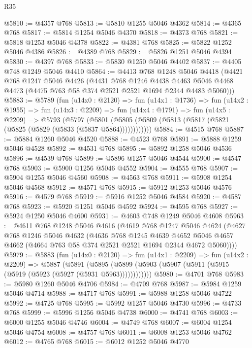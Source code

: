 \begin{lexlean}{R35}
\begin{coremodule}
@5810 := @4357 @768
@5813 := @5810 @1255 @5046 @4362
@5814 := @4365 @768
@5817 := @5814 @1254 @5046 @4370
@5818 := @4373 @768
@5821 := @5818 @1253 @5046 @4378
@5822 := @4381 @768
@5825 := @5822 @1252 @5046 @4386
@5826 := @4389 @768
@5829 := @5826 @1251 @5046 @4394
@5830 := @4397 @768
@5833 := @5830 @1250 @5046 @4402
@5837 := @4405 @748 @1249 @5046 @4410
@5864 := @4413
    @768
    @1248
    @5046
    @4418
    (@4421
      @768
      @1247
      @5046
      @4426
      (@4431
        @768
        @1246
        @4438
        @4463
        @5046
        @4468
        @4473
        (@4475 @763 @58 @374 @2521 @2521 @1694 @2344 @4483 @5060)))
@5883 := @5789
    (fun (u14x0 : @2120) =>
    fun (u14x1 : @1736) =>
    fun (u14x2 : @1955) =>
    fun (u14x3 : @2209) =>
    fun (u14x4 : @1791) =>
    fun (u14x5 : @2209) =>
    @5793
      (@5797 (@5801 (@5805 (@5809 (@5813 (@5817 (@5821 (@5825 (@5829 (@5833 (@5837 @5864))))))))))))
@5884 := @4515 @768
@5887 := @5884 @1260 @5046 @4520
@5888 := @4523 @768
@5891 := @5888 @1259 @5046 @4528
@5892 := @4531 @768
@5895 := @5892 @1258 @5046 @4536
@5896 := @4539 @768
@5899 := @5896 @1257 @5046 @4544
@5900 := @4547 @768
@5903 := @5900 @1256 @5046 @4552
@5904 := @4555 @768
@5907 := @5904 @1255 @5046 @4560
@5908 := @4563 @768
@5911 := @5908 @1254 @5046 @4568
@5912 := @4571 @768
@5915 := @5912 @1253 @5046 @4576
@5916 := @4579 @768
@5919 := @5916 @1252 @5046 @4584
@5920 := @4587 @768
@5923 := @5920 @1251 @5046 @4592
@5924 := @4595 @768
@5927 := @5924 @1250 @5046 @4600
@5931 := @4603 @748 @1249 @5046 @4608
@5963 := @4611
    @768
    @1248
    @5046
    @4616
    (@4619
      @768
      @1247
      @5046
      @4624
      (@4627
        @768
        @1246
        @5046
        @4632
        (@4636
          @768
          @1245
          @4639
          @4652
          @5046
          @4657
          @4662
          (@4664 @763 @58 @374 @2521 @2521 @1694 @2344 @4672 @5060))))
@5979 := @5883
    (fun (u14x0 : @2120) =>
    fun (u14x1 : @2209) =>
    fun (u14x2 : @2209) =>
    @5887
      (@5891 (@5895 (@5899 (@5903 (@5907 (@5911 (@5915 (@5919 (@5923 (@5927 (@5931 @5963))))))))))))
@5980 := @4701 @768
@5983 := @5980 @1260 @5046 @4706
@5984 := @4709 @768
@5987 := @5984 @1259 @5046 @4714
@5988 := @4717 @768
@5991 := @5988 @1258 @5046 @4722
@5992 := @4725 @768
@5995 := @5992 @1257 @5046 @4730
@5996 := @4733 @768
@5999 := @5996 @1256 @5046 @4738
@6000 := @4741 @768
@6003 := @6000 @1255 @5046 @4746
@6004 := @4749 @768
@6007 := @6004 @1254 @5046 @4754
@6008 := @4757 @768
@6011 := @6008 @1253 @5046 @4762
@6012 := @4765 @768
@6015 := @6012 @1252 @5046 @4770

\end{coremodule}
\end{lexlean}
